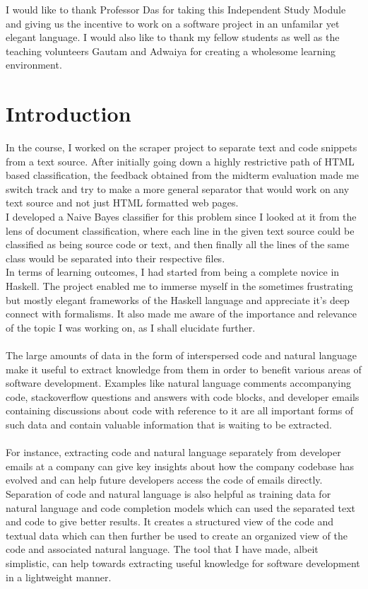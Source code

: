 \documentclass[12pt]{scrreprt}
\begin{document}
I would like to thank Professor Das for taking this Independent Study Module and giving us the incentive to work on a software project in an unfamilar yet elegant language. I would also like to thank my fellow students as well as the teaching volunteers Gautam and Adwaiya for creating a wholesome learning environment. 


\chapter{Introduction}


In the course, I worked on the scraper project to separate text and code snippets from a text source. After initially going down a highly restrictive path of HTML based classification, the feedback obtained from the midterm evaluation made me switch track and try to make a more general separator that would work on any text source and not just HTML formatted web pages. \\ I developed a Naive Bayes classifier for this problem since I looked at it from the lens of document classification, where each line in the given text source could be classified as being source code or text, and then finally all the lines of the same class would be separated into their respective files.\\ In terms of learning outcomes, I had started from being a complete novice in Haskell. The project enabled me to immerse myself in the sometimes frustrating but mostly elegant frameworks of the Haskell language and appreciate it's deep connect with formalisms. It also made me aware of the importance and relevance of the topic I was working on, as I shall elucidate further.\\
\\ The large amounts of data in the form of interspersed code and natural language make it useful to extract knowledge from them in order to benefit various areas of software development. Examples like natural language comments accompanying code, stackoverflow questions and answers with code blocks, and developer emails containing discussions about code with reference to it are all important forms of such data and contain valuable information that is waiting to be extracted. \\ 
\\ For instance, extracting code and natural language separately from developer emails at a company can give key insights about how the company codebase has evolved and can help future developers access the code of emails directly. Separation of code and natural language is also helpful as training data for natural language and code completion models which can used the separated text and code to give better results. It creates a structured view of the code and textual data which can then further be used to create an organized view of the code and associated natural language. The tool that I have made, albeit simplistic, can help towards extracting useful knowledge for software development in a lightweight manner. 
\end{document}
